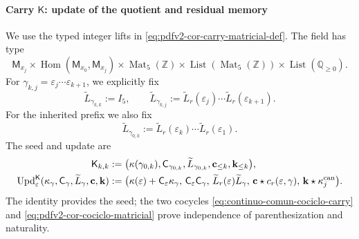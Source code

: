 \paragraph{Carry \(\mathsf K\): update of the quotient and residual memory}
We use the typed integer lifts in
\eqref{eq:pdfv2-cor-carry-matricial-def}. The field has type
\[
 \mathsf M_{x_j}\times
 \operatorname{Hom}(\mathsf M_{x_0},\mathsf M_{x_j})
 \times\operatorname{Mat}_5(\mathbb Z)
 \times\operatorname{List}(\operatorname{Mat}_5(\mathbb Z))
 \times\operatorname{List}(\mathbb Q_{\geq0}).
\]
For \(\gamma_{k,j}=\varepsilon_j\cdots\varepsilon_{k+1}\), we explicitly
fix
\begin{equation}
\label{eq:pdfv2-terminal-lift-entero-ruta}
 \widetilde L_{\gamma_{k,k}}:=I_5,\qquad
 \widetilde L_{\gamma_{k,j}}
 :=\widetilde L_r(\varepsilon_j)\cdots
   \widetilde L_r(\varepsilon_{k+1}).
\end{equation}
For the inherited prefix we also fix
\[
 \widetilde L_{\gamma_{0,k}}
 :=\widetilde L_r(\varepsilon_k)\cdots
   \widetilde L_r(\varepsilon_1).
\]
The seed and update are
\begin{align}
 \mathsf K_{k,k}&:=
 \bigl(\kappa(\gamma_{0,k}),\mathsf C_{\gamma_{0,k}},
       \widetilde L_{\gamma_{0,k}},
       \mathbf c_{\leq k},\mathbf k_{\leq k}\bigr),
 \label{eq:pdfv2-terminal-semilla-k}\\
 \operatorname{Upd}^{\mathsf K}_{\varepsilon}
 (\kappa_\gamma,\mathsf C_\gamma,\widetilde L_\gamma,
   \mathbf c,\mathbf k)
 &:=
 \bigl(\kappa(\varepsilon)+\mathsf C_\varepsilon\kappa_\gamma,\,
 \mathsf C_\varepsilon\mathsf C_\gamma,\,
 \widetilde L_r(\varepsilon)\widetilde L_\gamma,\,
 \mathbf c\star c_r(\varepsilon,\gamma),\,
 \mathbf k\star\kappa_j^{\rm can}\bigr).
 \label{eq:pdfv2-terminal-update-k}
\end{align}
The identity provides the seed; the two cocycles
\eqref{eq:continuo-comun-cociclo-carry} and
\eqref{eq:pdfv2-cor-cociclo-matricial} prove independence of
parenthesization and naturality.

